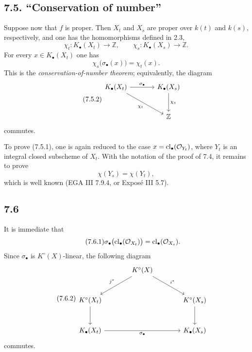\subsection*{7.5. ``Conservation of number''}
Suppose now that $f$ is proper. Then $X_t$ and $X_s$ are proper over
$k(t)$ and $k(s)$, respectively, and one has the homomorphisms defined in
2.3,
\[
\chi_t:K_\bullet(X_t)\longrightarrow\mathbb Z,
\qquad
\chi_s:K_\bullet(X_s)\longrightarrow\mathbb Z.
\]
For every $x\in K_\bullet(X_t)$ one has
\begin{equation}\tag{7.5.1}
\chi_s\bigl(\sigma_\bullet(x)\bigr)=\chi_t(x).
\end{equation}
This is the \emph{conservation-of-number theorem}; equivalently, the diagram
\begin{equation}\tag{7.5.2}
\begin{tikzcd}[column sep=large,row sep=large]
K_\bullet(X_t) \arrow[r,"\sigma_\bullet"] \arrow[dr,"\chi_t"'] &
K_\bullet(X_s) \arrow[d,"\chi_s"]\\
& \mathbb Z
\end{tikzcd}
\end{equation}
commutes.

To prove (7.5.1), one is again reduced to the case
$x=\operatorname{cl}_\bullet(\mathcal O_{Y_t})$, where $Y_t$ is an integral closed
subscheme of $X_t$. With the notation of the proof of 7.4, it remains to
prove
\[
\chi(Y_s)=\chi(Y_t),
\]
which is well known (EGA III 7.9.4, or Expos\'e III 5.7).

\subsection*{7.6}
It is immediate that
\begin{equation}\tag{7.6.1}
\sigma_\bullet\bigl(\operatorname{cl}_\bullet(\mathcal O_{X_t})\bigr)
=\operatorname{cl}_\bullet(\mathcal O_{X_s}).
\end{equation}
Since $\sigma_\bullet$ is $K^\circ(X)$-linear, the following diagram
\begin{equation}\tag{7.6.2}
\begin{tikzcd}[column sep=large,row sep=large]
& K^\circ(X) \arrow[dl,"j^*"'] \arrow[dr,"i^*"] &\\
K^\circ(X_t) \arrow[d] && K^\circ(X_s) \arrow[d]\\
K_\bullet(X_t) \arrow[rr,"\sigma_\bullet"'] && K_\bullet(X_s)
\end{tikzcd}
\end{equation}
commutes.

